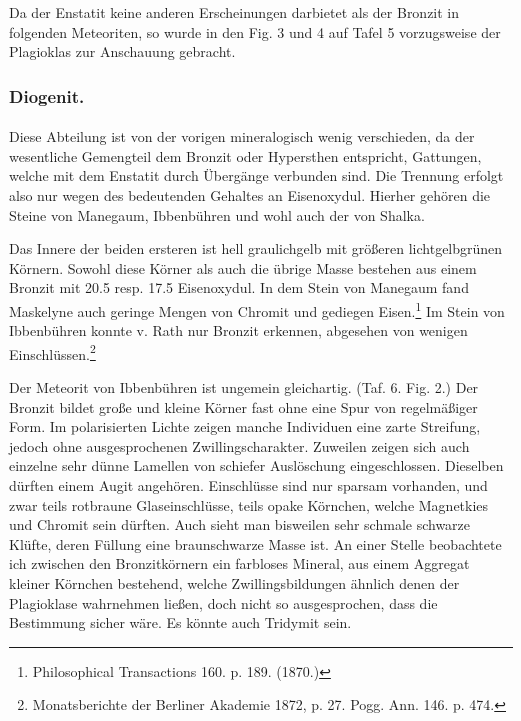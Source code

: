 \documentclass[a4paper, 12pt, oneside]{article}
\begin{document}
Da der Enstatit keine anderen Erscheinungen darbietet als der Bronzit in folgenden Meteoriten, so wurde in den Fig. 3 und 4 auf Tafel 5 vorzugsweise der Plagioklas zur Anschauung gebracht.

\subsubsection{Diogenit.}
\paragraph{}
Diese Abteilung ist von der vorigen mineralogisch wenig verschieden, da der wesentliche Gemengteil dem Bronzit oder Hypersthen entspricht, Gattungen, welche mit dem Enstatit durch Übergänge verbunden sind. Die Trennung erfolgt also nur wegen des bedeutenden Gehaltes an Eisenoxydul. Hierher gehören die Steine von Manegaum, Ibbenbühren und wohl auch der von Shalka.

Das Innere der beiden ersteren ist hell graulichgelb mit größeren lichtgelbgrünen Körnern. Sowohl diese Körner als auch die übrige Masse bestehen aus einem Bronzit mit 20.5 resp. 17.5 Eisenoxydul. In dem Stein von Manegaum fand Maskelyne auch geringe Mengen von Chromit und gediegen Eisen.\footnote{Philosophical Transactions 160. p. 189. (1870.)} Im Stein von Ibbenbühren konnte v. Rath nur Bronzit erkennen, abgesehen von wenigen Einschlüssen.\footnote{Monatsberichte der Berliner Akademie 1872, p. 27. Pogg. Ann. 146. p. 474.}

Der Meteorit von Ibbenbühren ist ungemein gleichartig. (Taf. 6. Fig. 2.) Der Bronzit bildet große und kleine Körner fast ohne eine Spur von regelmäßiger Form. Im polarisierten Lichte zeigen manche Individuen eine zarte Streifung, jedoch ohne ausgesprochenen Zwillingscharakter. Zuweilen zeigen sich auch einzelne sehr dünne Lamellen von schiefer Auslöschung eingeschlossen. Dieselben dürften einem Augit angehören. Einschlüsse sind nur sparsam vorhanden, und zwar teils rotbraune Glaseinschlüsse, teils opake Körnchen, welche Magnetkies und Chromit sein dürften. Auch sieht man bisweilen sehr schmale schwarze Klüfte, deren Füllung eine braunschwarze Masse ist. An einer Stelle beobachtete ich zwischen den Bronzitkörnern ein farbloses Mineral, aus einem Aggregat kleiner Körnchen bestehend, welche Zwillingsbildungen ähnlich denen der Plagioklase wahrnehmen ließen, doch nicht so ausgesprochen, dass die Bestimmung sicher wäre. Es könnte auch Tridymit sein.
\end{document}
